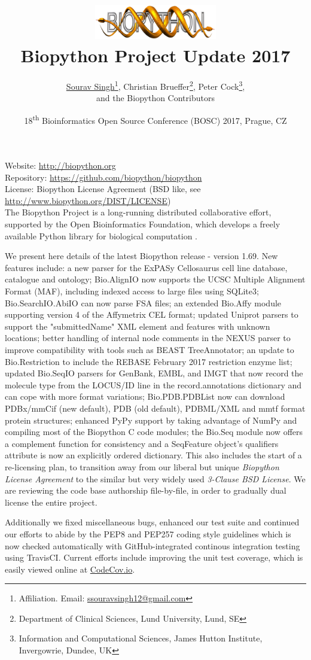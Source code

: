 \documentclass[10pt,oneside]{article}
\title{%
\vspace{-1.5in}
\includegraphics[width=0.4\textwidth]{biopython.jpg}\\
\vspace{3mm}Biopython Project Update 2017}
\author{
	\underline{Sourav Singh}\thanks{Affiliation. Email: \href{mailto:ssouravsingh12@gmail.com}{ssouravsingh12@gmail.com}},
    Christian Brueffer\thanks{Department of Clinical Sciences, Lund University, Lund, SE},
    Peter Cock\thanks{Information and Computational Sciences, James Hutton Institute, Invergowrie, Dundee, UK},\\
    and the Biopython Contributors}
\date{18\textsuperscript{th} Bioinformatics Open Source Conference (BOSC) 2017, Prague, CZ}
\begin{document}
\maketitle
\thispagestyle{empty}

\vspace{-0.2in}
\noindent
Website: \url{http://biopython.org} \\
Repository: \url{https://github.com/biopython/biopython} \\
License: Biopython License Agreement (BSD like, see \url{http://www.biopython.org/DIST/LICENSE}) \\

The Biopython Project is a long-running distributed collaborative effort,
supported by the Open Bioinformatics Foundation, which develops a freely
available Python library for biological computation \cite{AppNote}.

We present here details of the latest Biopython release - version 1.69.
New features include: a new parser for the ExPASy Cellosaurus cell line
database, catalogue and ontology; Bio.AlignIO now supports the UCSC Multiple
Alignment Format (MAF), including indexed access to large files using SQLite3;
Bio.SearchIO.AbiIO can now parse FSA files; an extended Bio.Affy module supporting
version 4 of the Affymetrix CEL format; updated Uniprot parsers to support
the "submittedName" XML element and features with unknown locations; better
handling of internal node comments in the NEXUS parser to improve compatibility
with tools such as BEAST TreeAnnotator; an update to Bio.Restriction to include
the REBASE February 2017 restriction enzyme list; updated Bio.SeqIO parsers for
GenBank, EMBL, and IMGT that now record the molecule type from the LOCUS/ID line
in the record.annotations dictionary and can cope with more format variations;
Bio.PDB.PDBList now can download PDBx/mmCif (new default), PDB (old default),
PDBML/XML and mmtf format protein structures; enhanced PyPy support by taking
advantage of NumPy and compiling most of the Biopython C code modules; the Bio.Seq
module now offers a complement function for consistency and a SeqFeature object's
qualifiers attribute is now an explicitly ordered dictionary.
This also includes the start of a re-licensing plan, to transition away from our liberal
but unique \emph{Biopython License Agreement} to the similar but very widely used
\emph{3-Clause BSD License}. We are reviewing the code base authorship file-by-file,
in order to gradually dual license the entire project.

Additionally we fixed miscellaneous bugs, enhanced our test suite and continued our
efforts to abide by the PEP8 and PEP257 coding style guidelines which is now checked
automatically with GitHub-integrated continous integration testing using TravisCI.
Current efforts include improving the unit test coverage, which is easily viewed
online at \href{https://codecov.io/github/biopython/biopython/}{CodeCov.io}.
\end{document}
